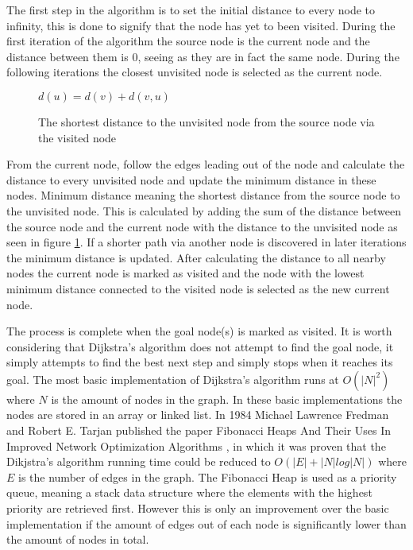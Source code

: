 The first step in the algorithm is to set the initial distance to every node to infinity, this is done to signify that the node has yet to been visited. During the first iteration of the algorithm the
source node is the current node and the distance between them is 0, seeing as they are in fact the same node. During the following iterations the closest unvisited node is selected as the
current node.

\begin{figure}[h]
\centering
\begin{math}
d(u) = d(v) + d(v,u)
\end{math}
\caption{The shortest distance to the unvisited node from the source node via the visited node}
\label{fig:relax}
\end{figure}

From the current node, follow the edges leading out of the node and calculate the distance to every unvisited node and update the minimum distance in these nodes. Minimum distance meaning the shortest distance from the source node to the unvisited node. This is calculated by adding the sum of the distance between the source node and the current node with the distance to the unvisited node as seen in figure \ref{fig:relax}. If a shorter path via another node is discovered in later iterations the minimum distance is updated. After calculating the distance to all nearby nodes the current node is marked as visited and the node with the lowest minimum distance connected to the visited node is selected as the new current node. 

The process is complete when the goal node(s) is marked as visited. It is worth considering that Dijkstra's algorithm does not attempt to find the goal node, it simply attempts to find the best next step and simply stops when it reaches its goal. The most basic implementation of Dijkstra's algorithm runs at $O(|N|^2)$ where $N$ is the amount of nodes in the graph. In these basic implementations the nodes are stored in an array or linked list. In 1984 Michael Lawrence Fredman and Robert E. Tarjan published the paper Fibonacci Heaps And Their Uses In Improved Network Optimization Algorithms \cite{715934}, in which it was proven that the Dikjstra's algorithm running time could be reduced to $O(|E| + |N|log|N|)$ where $E$ is the number of edges in the graph. The Fibonacci Heap is used as a priority queue, meaning a stack data structure where the elements with the highest priority are retrieved first. However this is only an improvement over the basic implementation if the amount of edges out of each node is significantly lower than the amount of nodes in total.

